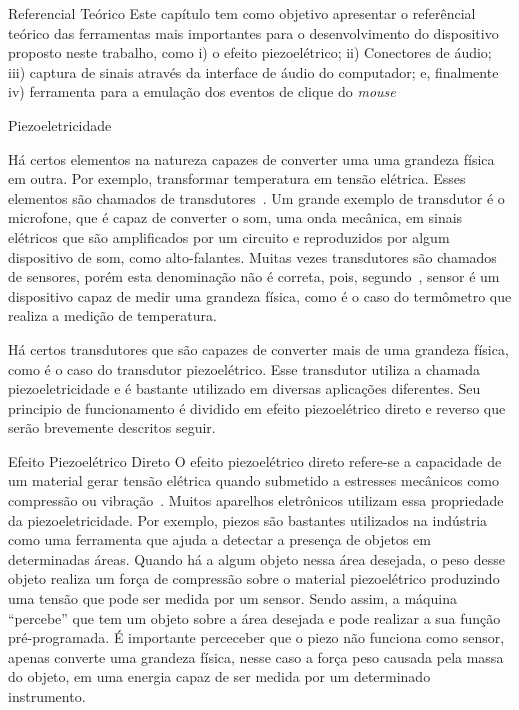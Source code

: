 \begin{chapter}{Referencial Teórico}
Este capítulo tem como objetivo apresentar o referêncial teórico das ferramentas
mais importantes para o desenvolvimento do dispositivo proposto neste trabalho,
como i) o efeito piezoelétrico; ii) Conectores de áudio; iii) captura de sinais
através da interface de áudio do computador; e, finalmente iv) ferramenta para a
emulação dos eventos de clique do \textit{mouse}

\begin{section}{Piezoeletricidade}

Há certos elementos na natureza capazes de converter uma uma grandeza física em
outra. Por exemplo, transformar temperatura em tensão elétrica. Esses
elementos são chamados de transdutores~\cite{william}. Um grande exemplo de
transdutor é o microfone, que é capaz de converter o som, uma onda mecânica, em
sinais elétricos que são amplificados por um circuito e reproduzidos por algum
dispositivo de som, como alto-falantes. Muitas vezes transdutores são chamados
de sensores, porém esta denominação não é correta, pois, segundo~\cite{usher},
sensor é um dispositivo capaz de medir uma grandeza física, como é o caso do
termômetro que realiza a medição de temperatura. 

Há certos transdutores que são capazes de converter mais de uma grandeza física,
como é o caso do transdutor piezoelétrico. Esse transdutor utiliza a chamada
piezoeletricidade e é bastante utilizado em diversas aplicações diferentes. Seu
principio de funcionamento é dividido em efeito piezoelétrico direto e reverso
que serão brevemente descritos seguir.

\begin{subsection}{Efeito Piezoelétrico Direto}
O efeito piezoelétrico direto refere-se a capacidade de um material gerar tensão
elétrica quando submetido a estresses mecânicos como compressão ou
vibração~\cite{jaffe2012piezoelectric}. Muitos
aparelhos eletrônicos utilizam essa propriedade da piezoeletricidade. Por exemplo,
piezos são bastantes utilizados na indústria como uma ferramenta que ajuda a
detectar a presença de objetos em determinadas áreas. Quando há a algum objeto
nessa área desejada, o peso desse objeto realiza um força de compressão sobre 
o material piezoelétrico produzindo uma tensão que pode ser medida por um
sensor. Sendo assim, a máquina  ``percebe'' que tem um objeto
sobre a área desejada e pode realizar a sua função pré-programada. É importante
perceceber que o piezo não funciona como sensor, apenas converte uma grandeza
física, nesse caso a força peso causada pela massa do objeto, em uma energia
capaz de ser medida por um determinado instrumento.


\end{subsection}
\end{section}
\end{chapter}
